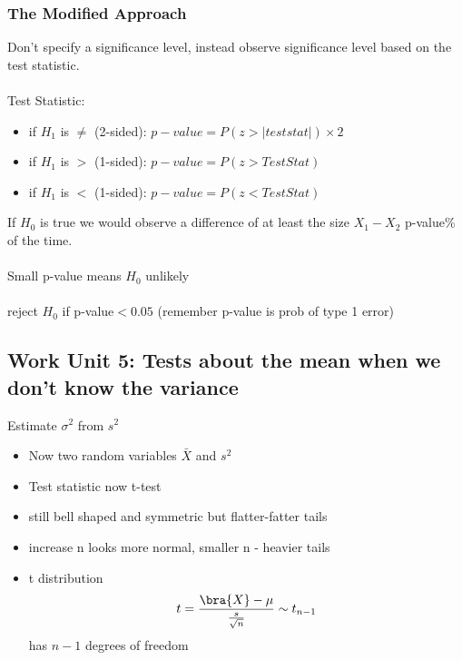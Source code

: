 \documentclass[a4paper,10pt]{article}
\begin{document}
\subsubsection{The Modified Approach}
Don't specify a significance level, instead observe significance level based on the test statistic. \\ \\ Test Statistic:

\begin{itemize}
	\item if $H_1$ is $\neq$ (2-sided): $p-value = P(z>|test stat|)\times 2$
	\item if $H_1$ is $>$ (1-sided): $p-value = P (z>Test Stat)$
	\item if $H_1$ is $<$ (1-sided): $p-value = P (z<Test Stat)$
\end{itemize}

If $H_0$ is true we would observe a difference of at least the size $X_1 - X_2$ p-value\% of the time. \\ \\ Small p-value means $H_0$ unlikely \\ \\reject $H_0$ if p-value$< 0.05$ (remember p-value is prob of type 1 error) 

\subsection{Work Unit 5: Tests about the mean when we don't know the variance}

Estimate $\sigma^2$ from $s^2$
\begin{itemize}
	\item Now two random variables $\bar{X}$ and $s^2$
	\item Test statistic now t-test
	\item still bell shaped and symmetric but flatter-fatter tails
	\item increase n looks more normal, smaller n - heavier tails
	\item t distribution \[ t = \frac{\bra{X}- \mu}{\frac{s}{\sqrt{n}}} \sim t_{n-1}\] has $n-1$ degrees of freedom
\end{itemize}
\end{document}
